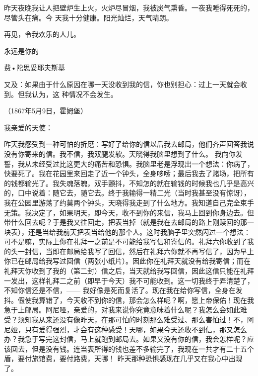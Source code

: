 \documentclass{article}
\begin{document}
\newpage

昨天夜晚我让人把壁炉生上火，火炉尽冒烟，我被炭气熏昏。一夜我睡得死死的，尽管头在痛。今
天我十分健康。阳光灿烂，天气晴朗。 


再见，令我欢乐的人儿。 


永远是你的 


费•陀思妥耶夫斯基 

又及：如果由于什么原因在哪一天没收到我的信，你也别担心：过上一天就会收到。但我认为，这
种情况不会发生。 


（1867年5月9日，霍姆堡） 


我亲爱的天使： 

昨天我感受到一种可怕的折磨：写好了给你的信以后我去邮局，他们齐声回答我说没有你寄来的信。我不信，我双腿发软。天晓得我脑里想到了什么。
\newpage
我向你发誓，我从未经受过比这更大的痛苦和恐惧。我脑里老是浮现出一个想法：你病了，快要死了。我在花园里来回走了近一个钟头，全身哆嗦；最后我去了赌场，把所有的钱都输光了。我失魂落魄，双手颤抖，不知怎的就在输钱的时候我也几乎是高兴的，口中说着：随它去，随它去。终于我输得一精二光（当时我甚至没有惊讶），我在公园里游荡了约莫两个钟头，天晓得我走到了什么地方。我知道自己完全束手无策。我决定了，如果明天，即今天，收不到你的来信，我马上回到你身边去。但带什么回去呢？于是我又往回走，把表当掉（就是我在去邮局的路上刚赎回的那一块表），还是当给我前天把表当给他的那个人。这时我脑子里突然闪过一个想法：可不是嘛，实际上你在礼拜一之前是不可能给我写信和寄信的。礼拜六你收到了我的头一封信，当即在邮局给我写了回信，然后在礼拜六你就不再写信了，因为早上你已在邮局给我写过回信（两张小纸片）。因此你在礼拜天就没有给我寄信；而在礼拜天你收到了我的（第二封）信之后，当天就给我写回信，因此这信只能在礼拜一发出，这样礼拜二之前（即早于今天）我不可能收到。这一切我终于弄清楚了，不知你信还是不信，——
\newpage
我好像是死而复活了。现在我在给你写信，全身在发抖。假使我算错了，今天收不到你的信，那会怎么样呢？啊，愿上帝保佑！现在我急于上邮局。阿尼哑，亲爱的，对我来说你究竟意味着什么呢？我怎么会如此难受？须知我从来还没有像昨天，在那可怕的时刻那么难受过、那么害怕过！不，阿尼娅，只有爱得强烈，才会有这种感受！天哪，如果今天还收不到信，那又怎么办？我急于写完这封信，马上就跑到邮局去。如果又没有你的信，我会怎样呢？应该回去，但是没有钱。连当表所得的钱也差不多输完了，我现在一共才有二十五个盾，要付旅馆费，要付路费，天哪！
昨天那种恐惧感现在几乎又在我心中出现了。 
\end{document}
